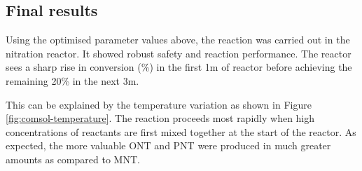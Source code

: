 \subsection{Final results}
Using the optimised parameter values above, the reaction was carried out in the nitration reactor. It showed robust safety and reaction performance.
The reactor sees a sharp rise in conversion (\%) in the first 1m of reactor before achieving the remaining 20\% in the next \approx 3m. 

This can be explained by the temperature variation as shown in Figure \ref{fig:comsol-temperature}. The reaction proceeds most rapidly when high concentrations of reactants are first mixed together at the start of the reactor.  
As expected, the more valuable ONT and PNT were produced in much greater amounts as compared to MNT. 

